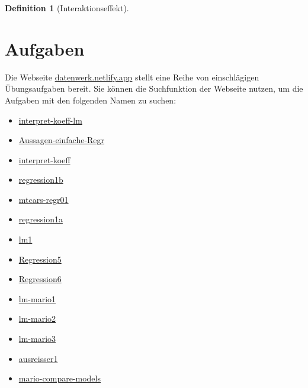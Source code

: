 \documentclass[
  letterpaper,
]{scrbook}
\providecommand{\tightlist}{%
  \setlength{\itemsep}{0pt}\setlength{\parskip}{0pt}}\usepackage{longtable,booktabs,array}
\theoremstyle{definition}
\theoremstyle{definition}
\theoremstyle{definition}
\newtheorem{definition}{Definition}[chapter]
\theoremstyle{remark}
\begin{document}
\begin{definition}[Interaktionseffekt]
\begin{figure}
\end{figure}%

\section{Aufgaben}\label{aufgaben-8}

Die Webseite \href{https://datenwerk.netlify.app}{datenwerk.netlify.app}
stellt eine Reihe von einschlägigen Übungsaufgaben bereit. Sie können
die Suchfunktion der Webseite nutzen, um die Aufgaben mit den folgenden
Namen zu suchen:

\begin{itemize}
\tightlist
\item
  \href{https://sebastiansauer.github.io/Datenwerk/posts/interpret-koeff-lm/interpret-koeff-lm.html}{interpret-koeff-lm}
\item
  \href{https://sebastiansauer.github.io/Datenwerk/posts/aussagen-einfache-regr/aussagen-einfache-regr}{Aussagen-einfache-Regr}
\item
  \href{https://sebastiansauer.github.io/Datenwerk/posts/interpret-koeff/interpret-koeff.html}{interpret-koeff}
\item
  \href{https://sebastiansauer.github.io/Datenwerk/posts/regression1b/regression1b.html}{regression1b}
\item
  \href{https://sebastiansauer.github.io/Datenwerk/posts/mtcars-regr01/mtcars-regr01.html}{mtcars-regr01}
\item
  \href{https://sebastiansauer.github.io/Datenwerk/posts/regression1a/regression1a.html}{regression1a}
\item
  \href{https://sebastiansauer.github.io/Datenwerk/posts/lm1/lm1.html}{lm1}
\item
  \href{https://sebastiansauer.github.io/Datenwerk/posts/regression5/regression5}{Regression5}
\item
  \href{https://sebastiansauer.github.io/Datenwerk/posts/regression6/regression6}{Regression6}
\item
  \href{https://sebastiansauer.github.io/Datenwerk/posts/lm-mario1/lm-mario1.html}{lm-mario1}
\item
  \href{https://sebastiansauer.github.io/Datenwerk/posts/lm-mario2/lm-mario2.html}{lm-mario2}
\item
  \href{https://sebastiansauer.github.io/Datenwerk/posts/lm-mario3/lm-mario3.html}{lm-mario3}
\item
  \href{https://sebastiansauer.github.io/Datenwerk/posts/ausreisser1/ausreisser1.html}{ausreisser1}
\item
  \href{https://sebastiansauer.github.io/Datenwerk/posts/mario-compare-models/}{mario-compare-models}
\end{itemize}


\end{definition}
\end{document}
